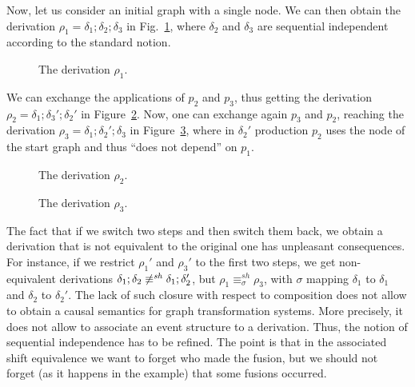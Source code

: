 \documentclass{llncs}
\newcommand{\shifteq}[1][]{\ensuremath{\mathrel{{\equiv}^\mathit{sh}_{#1}}}}
\begin{document}
Now, let us consider an initial graph with a single node. We can then obtain
the derivation $\rho_1 = \delta_1; \delta_2; \delta_3$ in Fig.~\ref{fi:der1}, where $\delta_2$ and $\delta_3$ are
sequential independent according to the standard notion.

\begin{figure}
  
\caption{The derivation $\rho_1$.}
\label{fi:der1}
\end{figure}

We can exchange the applications of $p_2$ and $p_3$, thus getting the
derivation $\rho_2 = \delta_1; \delta_3'; \delta_2'$ in
Figure~\ref{fi:der2}. Now, one can exchange again $p_3$ and $p_2$,
reaching the derivation $\rho_3 = \delta_1; \delta_2'; \delta_3$ in
Figure~\ref{fi:der3}, where in $\delta_2'$ production $p_2$ uses the
node of the start graph and thus ``does not depend'' on $p_1$.


\begin{figure}[t]
  
\caption{The derivation $\rho_2$.}
\label{fi:der2}
\end{figure}

\begin{figure}[t]
  
\caption{The derivation $\rho_3$.}
\label{fi:der3}
\end{figure}

The fact that if we switch two steps and then switch them back, we obtain a derivation that is not equivalent to the original one has unpleasant consequences. For instance, if we restrict $\rho_1'$ and $\rho_3'$ to the first two steps, we get non-equivalent derivations $\delta_1;\delta_2 \not\shifteq \delta_1;\delta_2'$, but $\rho_1 \shifteq[\sigma] \rho_3$, with $\sigma$ mapping $\delta_1$ to $\delta_1$ and $\delta_2$ to $\delta_2'$.
%
The lack of such closure with respect to composition does not allow to obtain a causal semantics for graph transformation systems.
More precisely, it does  not allow to associate an event structure to a derivation.
%
Thus, the notion of sequential independence has to be refined. The point is that in the associated shift equivalence we want to forget who made the fusion, 
but we should not forget (as it happens in the example) that some fusions occurred.

\end{document}
